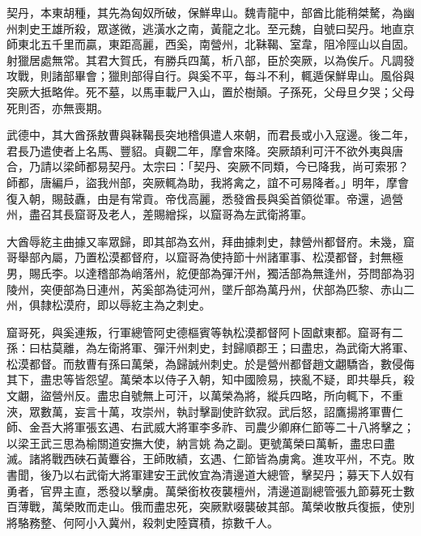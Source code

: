 
\begin{pinyinscope}

 契丹，本東胡種，其先為匈奴所破，保鮮卑山。魏青龍中，部酋比能稍桀驁，為幽州刺史王雄所殺，眾遂微，逃潢水之南，黃龍之北。至元魏，自號曰契丹。地直京師東北五千里而贏，東距高麗，西奚，南營州，北靺鞨、室韋，阻冷陘山以自固。射獵居處無常。其君大賀氏，有勝兵四萬，析八部，臣於突厥，以為俟斤。凡調發攻戰，則諸部畢會；獵則部得自行。與奚不平，每斗不利，輒遁保鮮卑山。風俗與突厥大抵略侔。死不墓，以馬車載尸入山，置於樹顛。子孫死，父母旦夕哭；父母死則否，亦無喪期。



 武德中，其大酋孫敖曹與靺鞨長突地稽俱遣人來朝，而君長或小入寇邊。後二年，君長乃遣使者上名馬、豐貂。貞觀二年，摩會來降。突厥頡利可汗不欲外夷與唐合，乃請以梁師都易契丹。太宗曰：「契丹、突厥不同類，今已降我，尚可索邪？師都，唐編戶，盜我州部，突厥輒為助，我將禽之，誼不可易降者。」明年，摩會復入朝，賜鼓纛，由是有常貢。帝伐高麗，悉發酋長與奚首領從軍。帝還，過營州，盡召其長窟哥及老人，差賜繒採，以窟哥為左武衛將軍。



 大酋辱紇主曲據又率眾歸，即其部為玄州，拜曲據刺史，隸營州都督府。未幾，窟哥舉部內屬，乃置松漠都督府，以窟哥為使持節十州諸軍事、松漠都督，封無極男，賜氏李。以達稽部為峭落州，紇便部為彈汗州，獨活部為無逢州，芬問部為羽陵州，突便部為日連州，芮奚部為徒河州，墜斤部為萬丹州，伏部為匹黎、赤山二州，俱隸松漠府，即以辱紇主為之刺史。



 窟哥死，與奚連叛，行軍總管阿史德樞賓等執松漠都督阿卜固獻東都。窟哥有二孫：曰枯莫離，為左衛將軍、彈汗州刺史，封歸順郡王；曰盡忠，為武衛大將軍、松漠都督。而敖曹有孫曰萬榮，為歸誠州刺史。於是營州都督趙文翽驕沓，數侵侮其下，盡忠等皆怨望。萬榮本以侍子入朝，知中國險易，挾亂不疑，即共舉兵，殺文翽，盜營州反。盡忠自號無上可汗，以萬榮為將，縱兵四略，所向輒下，不重浹，眾數萬，妄言十萬，攻崇州，執討擊副使許欽寂。武后怒，詔鷹揚將軍曹仁師、金吾大將軍張玄遇、右武威大將軍李多祚、司農少卿麻仁節等二十八將擊之；以梁王武三思為榆關道安撫大使，納言姚為之副。更號萬榮曰萬斬，盡忠曰盡滅。諸將戰西硤石黃麞谷，王師敗績，玄遇、仁節皆為虜禽。進攻平州，不克。敗書聞，後乃以右武衛大將軍建安王武攸宜為清邊道大總管，擊契丹；募天下人奴有勇者，官畀主直，悉發以擊虜。萬榮銜枚夜襲檀州，清邊道副總管張九節募死士數百薄戰，萬榮敗而走山。俄而盡忠死，突厥默啜襲破其部。萬榮收散兵復振，使別將駱務整、何阿小入冀州，殺刺史陸寶積，掠數千人。




\end{pinyinscope}
